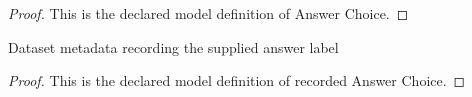 \begin{proof}
  This is the declared model definition of Answer Choice.
\end{proof}
\begin{definition}
  \label{def:physics:phyx-mini-0821:phyxminiproblems-problemphyxmini0821-recordedanswerchoice}
  Dataset metadata recording the supplied answer label
\end{definition}
\begin{proof}
  This is the declared model definition of recorded Answer Choice.
\end{proof}
